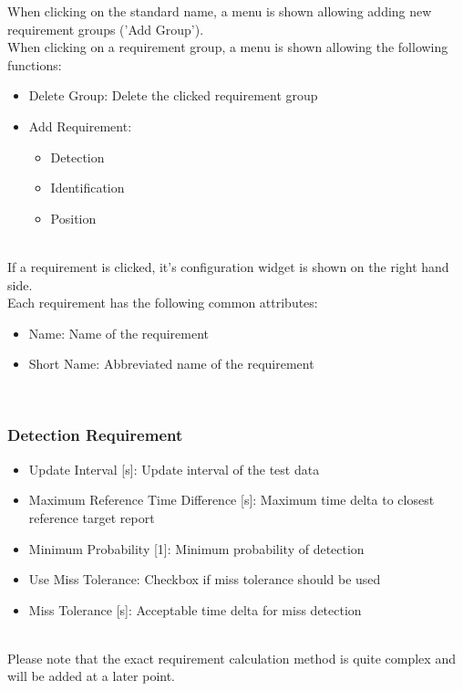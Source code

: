 When clicking on the standard name, a menu is shown allowing adding new requirement groups ('Add Group'). \\

When clicking on a requirement group, a menu is shown allowing the following functions:
\begin{itemize}  
\item Delete Group: Delete the clicked requirement group
\item Add Requirement:
\begin{itemize}  
\item Detection
\item Identification
\item Position
\end{itemize}
\end{itemize}
\ \\

If a requirement is clicked, it's configuration widget is shown on the right hand side. \\

Each requirement has the following common attributes:
\begin{itemize}  
\item Name: Name of the requirement
\item Short Name: Abbreviated name of the requirement
\end{itemize}
\ \\

\subsubsection{Detection Requirement}

\begin{itemize}  
\item Update Interval [s]: Update interval of the test data
\item Maximum Reference Time Difference [s]: Maximum time delta to closest reference target report
\item Minimum Probability [1]: Minimum probability of detection
\item Use Miss Tolerance: Checkbox if miss tolerance should be used
\item Miss Tolerance [s]: Acceptable time delta for miss detection
\end{itemize}
\ \\

Please note that the exact requirement calculation method is quite complex and will be added at a later point. \\

